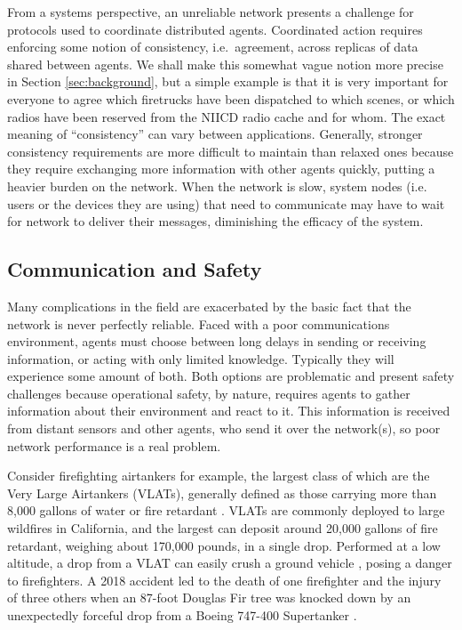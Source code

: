 \documentclass[]             %
{NASA}                       %
\theoremstyle{definition}
\begin{document}
From a systems perspective, an unreliable network presents a challenge
for protocols used to coordinate distributed agents. Coordinated
action requires enforcing some notion of consistency, i.e.~agreement,
across replicas of data shared between agents. We shall make this
somewhat vague notion more precise in Section \ref{sec:background},
but a simple example is that it is very important for everyone to
agree which firetrucks have been dispatched to which scenes, or which
radios have been reserved from the {\mbox{NIICD}} radio cache
\cite{radiocache} and for whom. The exact meaning of ``consistency''
can vary between applications. Generally, stronger consistency
requirements are more difficult to maintain than relaxed ones because
they require exchanging more information with other agents quickly,
putting a heavier burden on the network. When the network is slow,
system nodes (i.e. users or the devices they are using) that need to
communicate may have to wait for network to deliver their messages,
diminishing the efficacy of the system.

\subsection{Communication and Safety}
\label{communication-and-safety}

Many complications in the field are exacerbated by the basic fact that
the network is never perfectly reliable. Faced with a poor
communications environment, agents must choose between long delays in
sending or receiving information, or acting with only limited
knowledge. Typically they will experience some amount of both. Both
options are problematic and present safety challenges because
operational safety, by nature, requires agents to gather information
about their environment and react to it. This information is received
from distant sensors and other agents, who send it over the
network(s), so poor network performance is a real problem.

Consider firefighting airtankers for example, the largest class of
which are the Very Large Airtankers (VLATs), generally defined as
those carrying more than 8,000 gallons of water or fire retardant
\cite{2019:airtankerops}. VLATs are commonly deployed to large
wildfires in California, and the largest can deposit around 20,000
gallons of fire retardant, weighing about 170,000 pounds, in a single
drop. Performed at a low altitude, a drop from a VLAT can easily crush
a ground vehicle \cite{2019:stickney}, posing a danger to
firefighters. A 2018 accident led to the death of one firefighter and
the injury of three others when an 87-foot Douglas Fir tree was
knocked down by an unexpectedly forceful drop from a Boeing 747-400
Supertanker \cite{2018:calfire}.
\end{document}
